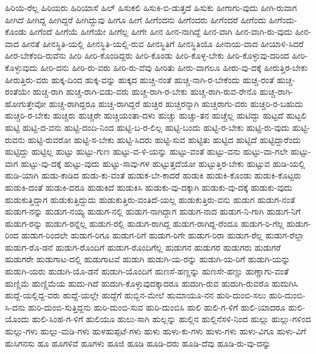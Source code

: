 {ಹಿರಿಯ-ರೆಲ್ಲ
ಹಿರಿಯರು
ಹಿರಿಯಾಸೆ
ಹಿಲ್
ಹಿಸುಕಲಿ
ಹಿಸುಕಿ-ಬಿ-ಡುತ್ತದೆ
ಹಿಸುಕು
ಹೀಗಾಗು-ವುದು
ಹೀಗಿ-ರುವಾಗ
ಹೀಗಿದೆ
ಹೀಗಿದ್ದ
ಹೀಗಿದ್ದರೆ
ಹೀಗಿದ್ದುವು
ಹೀಗೂ
ಹೀಗೆ
ಹೀಗೆಂದನು
ಹೀಗೆಂದರು
ಹೀಗೆಂದರೆ
ಹೀಗೆಂದು
ಹೀಗೆಂದು-ಕೊಂಡು
ಹೀಗೆಂದೆ
ಹೀಗೆಯೆ
ಹೀಗೆಯೇ
ಹೀಗೆಲ್ಲ
ಹೀಗೇ
ಹೀನ
ಹೀನ-ನಾಗಿದ್ದೆ
ಹೀನ-ವಾಗಿ
ಹೀನ-ವಾಗಿ-ರು-ವುದು
ಹೀನ-ವಾದ
ಹೀನತೆ
ಹೀನಸ್ಥಿತಿ-ಯಲ್ಲಿ
ಹೀನಸ್ಥಿತಿ-ಯಲ್ಲಿ-ರುವ
ಹೀನಸ್ಥಿತಿಗೆ
ಹೀನಸ್ಥಿತಿಯೊ
ಹೀನಾಯ-ವಾದ
ಹೀಯಾಳಿ-ಸಿದರೆ
ಹೀರ-ಬೇಕೆಂದಿ-ರುವೆನು
ಹೀರಿ
ಹೀರಿ-ಕೊಂಡಿದ್ದರು
ಹೀರಿ-ಕೊಂಡು
ಹೀರಿ-ಕೊಳ್ಳ-ಬೇಕು
ಹೀರಿ-ಕೊಳ್ಳುವು-ದರಿಂದ
ಹೀರಿ-ಕೊಳ್ಳುವುದು
ಹೀರಿ-ದನು
ಹೀರಿ-ರು-ವರು
ಹೀರಿ-ರು-ವೆವು
ಹೀರಿತು
ಹೀರು-ವಾಗಲೂ
ಹೀರು-ವು-ದಕ್ಕೆ
ಹೀರುತ್ತಿರ-ಬೇಕು
ಹೀರುತ್ತಿರು-ವರು
ಹುಕ್ಕ-ದಿಂದ
ಹುಕ್ಕ-ವನ್ನು
ಹುಕ್ಕದ
ಹುಚ್ಚ-ನಂತೆ
ಹುಚ್ಚ-ನಾಗಿ-ರ-ಬೇಕೆಂದು
ಹುಚ್ಚ-ರಂತೆ
ಹುಚ್ಚ-ರಂತೆಯೇ
ಹುಚ್ಚ-ರಾಗಿ
ಹುಚ್ಚ-ರಾಗಿ-ಬಿಡು-ವರು
ಹುಚ್ಚ-ರಾಗಿ-ರ-ಬೇಕು
ಹುಚ್ಚ-ರಾಗಿ-ರುವ-ರೇನೊ
ಹುಚ್ಚ-ರಾಗಿ-ಹೋಗುತ್ತೇವೋ
ಹುಚ್ಚ-ರಾಗಿದ್ದರೂ
ಹುಚ್ಚ-ರಾಗಿದ್ದರೆ
ಹುಚ್ಚರ
ಹುಚ್ಚರನ್ನಾಗಿ
ಹುಚ್ಚರಾಗು-ವರು
ಹುಚ್ಚರಿ-ರ-ಬಹುದು
ಹುಚ್ಚರಿ-ರ-ಬೇಕು
ಹುಚ್ಚರು
ಹುಚ್ಚರೇ
ಹುಚ್ಚಿಯಂತಾ-ದಳು
ಹುಚ್ಚು
ಹುಚ್ಚು-ತನ
ಹುಚ್ಚೆಲ್ಲ
ಹುಟಿದ್ದು
ಹುಟ್ಟದೆ
ಹುಟ್ಟಲಿ
ಹುಟ್ಟಿ
ಹುಟ್ಟಿ-ದ-ವನು
ಹುಟ್ಟಿ-ದಂದಿ-ನಿಂದ
ಹುಟ್ಟಿ-ಬ-ರ-ಲಿಲ್ಲ
ಹುಟ್ಟಿ-ಬಂದು
ಹುಟ್ಟಿ-ರ-ಬೇಕು
ಹುಟ್ಟಿ-ರು-ವುದು
ಹುಟ್ಟಿ-ರುವನು
ಹುಟ್ಟಿ-ರುವರೋ
ಹುಟ್ಟಿ-ಸ-ಬೇಕು
ಹುಟ್ಟಿ-ಸಿದರು
ಹುಟ್ಟಿ-ಸುವ
ಹುಟ್ಟಿತು
ಹುಟ್ಟಿದ
ಹುಟ್ಟಿದೆ
ಹುಟ್ಟಿದ್ದಾರೆಂದು
ಹುಟ್ಟಿದ್ದು
ಹುಟ್ಟಿಲ್ಲ
ಹುಟ್ಟು
ಹುಟ್ಟು-ಗುಣ
ಹುಟ್ಟು-ವ-ಳಿ-ಯನ್ನು
ಹುಟ್ಟು-ವಂತೆ
ಹುಟ್ಟು-ವನು
ಹುಟ್ಟು-ವಾ-ಗಲೇ
ಹುಟ್ಟು-ವಾಗ
ಹುಟ್ಟು-ವು-ದಕ್ಕೆ
ಹುಟ್ಟು-ವುದು
ಹುಟ್ಟು-ಸಾವು-ಗಳ
ಹುಟ್ಟುತ್ತದೆಯೋ
ಹುಟ್ಟುತ್ತಿರ-ಬೇಕು
ಹುಟ್ಟುವ
ಹುಡಿ-ಯಲ್ಲಿ
ಹುಡಿ-ಯಾಗಿ
ಹುಡು-ಕಾಡಿದ
ಹುಡು-ಕು-ವಂತೆ
ಹುಡುಕ-ಬೇ-ಕಾದರೆ
ಹುಡುಕಿ
ಹುಡುಕಿ-ಕೊಂಡು
ಹುಡುಕಿ-ಕೊಟ್ಟರು
ಹುಡುಕಿ-ದಂತೆ
ಹುಡುಕಿ-ದರೂ
ಹುಡುಕಿದೆ
ಹುಡುಕಿಸಿ
ಹುಡುಕು-ವು-ದಕ್ಕಾಗಿ
ಹುಡುಕು-ವು-ದಕ್ಕೆ
ಹುಡುಕು-ವುದು
ಹುಡುಕುತ್ತಿದ್ದಾಗ
ಹುಡುಕುತ್ತಿದ್ದುದು
ಹುಡುಕುತ್ತಿರು-ವಂತಿದೆ-ಯಲ್ಲ
ಹುಡುಕುತ್ತಿರು-ವನು
ಹುಡುಗ
ಹುಡುಗ-ನಂತೆ
ಹುಡುಗ-ನನ್ನು
ಹುಡುಗ-ನಯ್ಯ
ಹುಡುಗ-ನಲ್ಲಿ
ಹುಡುಗ-ನಾಗಿದ್ದಾಗ
ಹುಡುಗ-ನಾದ
ಹುಡುಗ-ನಿ-ಗಾಗಿ
ಹುಡುಗ-ನಿಗೆ
ಹುಡುಗ-ರನ್ನು
ಹುಡುಗ-ರನ್ನೆಲ್ಲ
ಹುಡುಗ-ರಲ್ಲಿ
ಹುಡುಗ-ರಾಗಿದ್ದ
ಹುಡುಗ-ರಾಗಿದ್ದ-ರೆಂದೂ
ಹುಡುಗ-ರಿ-ಗೆಲ್ಲ
ಹುಡುಗ-ರಿಂದ
ಹುಡುಗ-ರಿಂದಲೇ
ಹುಡುಗ-ರಿಗೂ
ಹುಡುಗ-ರಿಗೆ
ಹುಡುಗ-ರಿಗೇ
ಹುಡುಗ-ರಿರಾ
ಹುಡುಗ-ರೆಲ್ಲ
ಹುಡುಗ-ರೆಲ್ಲಾ
ಹುಡುಗ-ರೊ-ಡನೆ
ಹುಡುಗ-ರೊಂದಿಗೆ
ಹುಡುಗ-ರೊಂದಿಗೆಲ್ಲ
ಹುಡುಗನ
ಹುಡುಗರ
ಹುಡುಗರು
ಹುಡುಗರೆ
ಹುಡುಗರೇ
ಹುಡುಗಾಟ-ದಲ್ಲಿ
ಹುಡುಗಾಟವೆ
ಹುಡುಗಿ
ಹುಡುಗಿ-ಯ-ರನ್ನು
ಹುಡುಗಿ-ಯ-ರಿಗೆ
ಹುಡುಗಿ-ಯನ್ನು
ಹುಡುಗಿ-ಯರು
ಹುಡುಗಿ-ಯೊ-ಡನೆ
ಹುಡುಗಿ-ಯೊಂದಿಗೆ
ಹುಣಸೆ-ಹಣ್ಣನ್ನು
ಹುಣಸೇ-ಹಣ್ಣು
ಹುಣ್ಣಾಗು-ವಂತೆ
ಹುಣ್ಣಿಮೆ
ಹುಣ್ಣಿಮೆಯ
ಹುದು-ಗಿದೆ
ಹುದುಗಿ-ಕೊಳ್ಳುವುದಕ್ಕಾದರೂ
ಹುದುಗಿ-ರುವ
ಹುದುಗಿ-ರುವರೊ
ಹುದುಗಿಸಿ
ಹುದ್ದೆ-ಯಲ್ಲಿದ್ದ-ವರು
ಹುದ್ದೆ-ಯಲ್ಲೇ
ಹುದ್ದೆಗೆ
ಹುಬ್ಬಿನ-ಮೇಲೆ
ಹುಮಾಯೂ-ನನ
ಹುರಿ-ದುಂಬಿ-ಸಲು
ಹುರಿ-ದುಂಬಿ-ಸಿ-ದನು
ಹುರಿ-ದುಂಬಿ-ಸುತ್ತಿದ್ದನು
ಹುರಿ-ದುಂಬಿ-ಸುವ
ಹುರಿ-ದುಂಬಿಸಿ
ಹುಲಿ
ಹುಲಿ-ಗ-ಳಿಗೆ
ಹುಲಿ-ಯಾದರೂ
ಹುಲಿ-ಯೊಂದು
ಹುಲಿ-ಸಿಂಹ-ಗ-ಳಿಗೆ
ಹುಲಿಯೂ
ಹುಲು-ಸಾಗಿ
ಹುಲ್ಲನ್ನು
ಹುಲ್ಲಿನ
ಹುಲ್ಲಿನೆಸಳಿ-ನಿಂದ
ಹುಲ್ಲು
ಹುಲ್ಲು-ಗಳಿಂದ
ಹುಲ್ಲು-ಗಳು
ಹುಲ್ಲು-ಮಡಿ-ಗಳು
ಹುಳಹುಪ್ಪಟೆ-ಗಳು
ಹುಳು
ಹುಳು-ಕು-ಗಳು
ಹುಳು-ಗಳು
ಹುಳು-ವಿಗೂ
ಹುಳು-ವಿಗೆ
ಹುಸಿಗನಸು
ಹೂ
ಹೂಗಳಿವೆ
ಹೂಗಳು
ಹೂಜಿ
ಹೂಡಿ
ಹೂಡಿ-ದರು
ಹೂಡಿ-ದೆವು
ಹೂಡಿ-ರು-ವು-ದನ್ನು
}
